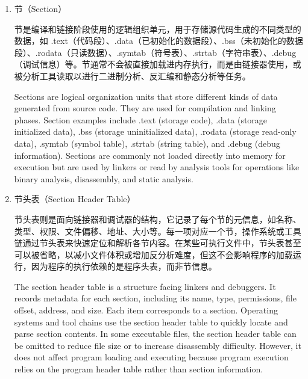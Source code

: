 \begin{enumerate} [label=\arabic*)]
\item 节（Section）

节是编译和链接阶段使用的逻辑组织单元，用于存储源代码生成的不同类型的数据，如 .text（代码段）、.data（已初始化的数据段）、.bss（未初始化的数据段）、.rodata（只读数据）、.symtab（符号表）、.strtab（字符串表）、.debug（调试信息）等。节通常不会被直接加载进内存执行，而是由链接器使用，或被分析工具读取以进行二进制分析、反汇编和静态分析等任务。

Sections are logical organization units that store different kinds of data generated from source code. They are used for compilation and linking phases. Section examples include .text (storage code), .data (storage initialized data), .bss (storage uninitialized data), .rodata (storage read-only data), .symtab (symbol table), .strtab (string table), and .debug (debug information). Sections are commonly not loaded directly into memory for execution but are used by linkers or read by analysis tools for operations like binary analysis, disassembly, and static analysis.

\item 节头表（Section Header Table）

节头表则是面向链接器和调试器的结构，它记录了每个节的元信息，如名称、类型、权限、文件偏移、地址、大小等。每一项对应一个节，操作系统或工具链通过节头表来快速定位和解析各节内容。在某些可执行文件中，节头表甚至可以被省略，以减小文件体积或增加反分析难度，但这不会影响程序的加载运行，因为程序的执行依赖的是程序头表，而非节信息。

The section header table is a structure facing linkers and debuggers. It records metadata for each section, including its name, type, permissions, file offset, address, and size. Each item corresponds to a section. Operating systems and tool chains use the section header table to quickly locate and parse section contents. In some executable files, the section header table can be omitted to reduce file size or to increase disassembly difficulty. However, it does not affect program loading and executing because program execution relies on the program header table rather than section information.  

\end{enumerate}

